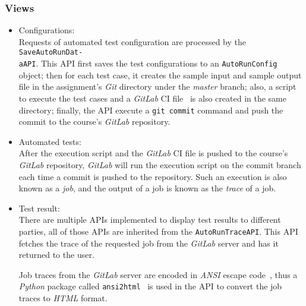 \subsubsection{Views}
\begin{itemize}
    \item Configurations: \\
    Requests of automated test configuration are processed by the
    \texttt{SaveAutoRunDat-\\aAPI}.
    This API first saves the test configurations to an \texttt{AutoRunConfig}
    object;
    then for each test case, it creates the sample input and sample output
    file in the assignment's \emph{Git} directory under the \emph{master}
    branch;
    also, a script to execute the test cases and a \emph{GitLab} CI file~\cite{gitlabConfig}
    is also created in the same
    directory;
    finally, the API execute a \texttt{git commit} command and push the commit
    to the course's \emph{GitLab} repository.

    \item Automated tests: \\
    After the execution script and the \emph{GitLab} CI file is pushed to the
    course's \emph{GitLab} repository, \emph{GitLab} will run the execution
    script on the commit branch each time a commit is pushed to the repository.
    Such an execution is also known as a \emph{job}, and the output of a job
    is known as the \emph{trace} of a job.

    \item Test result: \\
    There are multiple APIs implemented to display test results to different
    parties, all of those APIs are inherited from the \texttt{AutoRunTraceAPI}.
    This API fetches the trace of the requested job from the \emph{GitLab}
    server and has it returned to the user.

    Job traces from the \emph{GitLab} server are encoded in \emph{ANSI} escape
    code~\cite{ansi}, thus a \emph{Python} package called
    \texttt{ansi2html}~\cite{ansi2html}
    is used in the API to convert the job traces to \emph{HTML} format.
\end{itemize}

